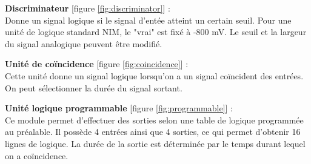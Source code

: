 \textbf{Discriminateur} [figure \ref{fig:discriminator}] :\\
Donne un signal logique si le signal d'entée atteint un certain seuil. Pour une unité de logique standard NIM, le "vrai" est fixé à -800 mV. Le seuil et la largeur du signal analogique peuvent être modifié.

\textbf{Unité de coïncidence} [figure \ref{fig:coincidence}] :\\
Cette unité donne un signal logique lorsqu'on a un signal coïncident des entrées. On peut sélectionner la durée du signal sortant.

\textbf{Unité logique programmable} [figure  \ref{fig:programmable}]  :\\
Ce module permet d'effectuer des sorties selon une table de logique programmée au préalable. Il possède 4 entrées ainsi que 4 sorties, ce qui permet d'obtenir 16 lignes de logique. La durée de la sortie est déterminée par le temps durant lequel on a coïncidence.

